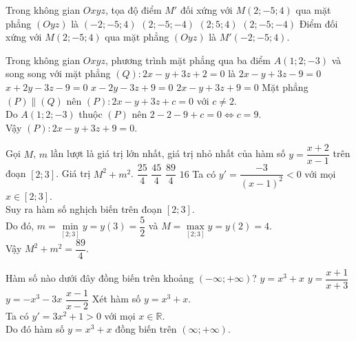 \begin{ex}%
	Trong không gian $Oxyz$, tọa độ điểm $M'$ đối xứng với $M(2;-5;4)$ qua mặt phẳng $(Oyz)$ là
	\choice
	{\True $(-2;-5;4)$}
	{$(2;-5;-4)$}
	{$(2;5;4)$}
	{$(2;-5;-4)$}
	\loigiai
	{
Điểm đối xứng với $M(2;-5;4)$ qua mặt phẳng $(Oyz)$ là $M'(-2;-5;4)$.
	}
\end{ex}
\begin{ex}%
Trong không gian $Oxyz$, phương trình mặt phẳng qua ba điểm $A(1;2;-3)$ và song song với mặt phẳng $(Q)\colon 2x-y+3z+2=0$ là
	\choice
	{$2x-y+3z-9=0$}
	{$x+2y-3z-9=0$}
	{$x-2y-3z+9=0$}
	{\True $2x-y+3z+9=0$}
	\loigiai
	{
		Mặt phẳng $(P)\parallel (Q)$ nên $(P)\colon 2x-y+3z+c=0$ với $c\ne 2$.\\
		Do $A(1;2;-3)$ thuộc $(P)$ nên $2-2-9+c=0\Leftrightarrow c=9$.\\
		Vậy $(P)\colon 2x-y+3z+9=0$.
	}
\end{ex}
\begin{ex}%
	Gọi $M$, $m$ lần lượt là giá trị lớn nhất, giá trị nhỏ nhất của hàm số $y=\dfrac{x+2}{x-1}$ trên đoạn $[2;3]$. Giá trị $M^2+m^2$.
	\choice
	{$\dfrac{25}{4}$}
	{$\dfrac{45}{4}$}
	{\True $\dfrac{89}{4}$}
	{$16$}
	\loigiai
	{
	Ta có $y'=\dfrac{-3}{(x-1)^2}<0$ với mọi $x\in [2;3]$.\\
	Suy ra hàm số nghịch biến trên đoạn $[2;3]$.\\
	Do đó, $m=\min\limits_{[2;3]}y=y(3)=\dfrac{5}{2}$ và $M=\max\limits_{[2;3]}y=y(2)=4$.\\
	Vậy $M^2+m^2=\dfrac{89}{4}$.
	}
\end{ex}
\begin{ex}%
Hàm số nào dưới đây đồng biến trên khoảng $(-\infty;+\infty)$?
	\choice
	{\True $y=x^3+x$}
	{$y=\dfrac{x+1}{x+3}$}
	{$y=-x^3-3x$}
	{$\dfrac{x-1}{x-2}$}
	\loigiai
	{
	Xét hàm số $y=x^3+x$.\\
	Ta có $y'=3x^2+1>0$ với mọi $x\in \mathbb{R}$.\\
	Do đó hàm số $y=x^3+x$ đồng biến trên $(\infty;+\infty)$.
	}
\end{ex}

